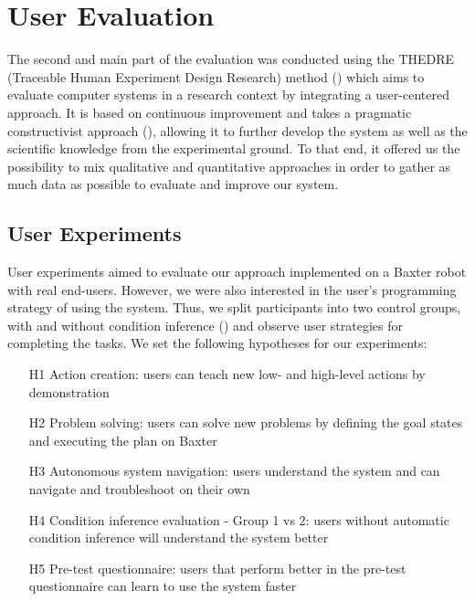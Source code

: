 
\section{User Evaluation}
\label{sec:quanteval}
The second and main part of the evaluation was conducted using the THEDRE (Traceable Human Experiment Design Research) method (\cite{mandran2018traceable,mandran2017thedre}) which aims to evaluate computer systems in a research context by integrating a user-centered approach.
It is based on continuous improvement and takes a pragmatic constructivist approach (\cite{avenier2015finding}), allowing it to further develop the system as well as the scientific knowledge from the experimental ground.
To that end, it offered us the possibility to mix qualitative and quantitative approaches in order to gather as much data as possible to evaluate and improve our system. 

\subsection{User Experiments}
User experiments aimed to evaluate our approach implemented on a Baxter robot with real end-users.
However, we were also interested in the user's programming strategy of using the system.
Thus, we split participants into two control groups, with and without condition inference () and observe user strategies for completing the tasks.
We set the following hypotheses for our experiments:
\begin{enumerate}
    \item[H1] Action creation: users can teach new low- and high-level actions by demonstration
    \item[H2] Problem solving: users can solve new problems by defining the goal states and executing the plan on Baxter
    \item[H3] Autonomous system navigation: users understand the system and can navigate and troubleshoot on their own
    \item[H4] Condition inference evaluation - Group 1 vs 2: users without automatic condition inference will understand the system better
    \item[H5] Pre-test questionnaire: users that perform better in the pre-test questionnaire can learn to use the system faster
\end{enumerate}

